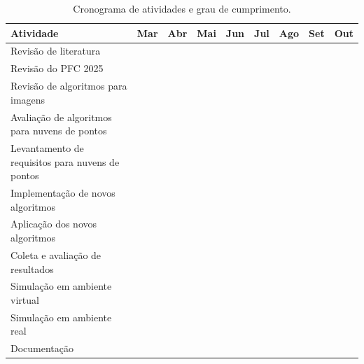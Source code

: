 \documentclass[
    12pt,
    openright,
    oneside,
    a4paper,
    english,
    brazil
]{abntex2}
\begin{document}
\begin{table}[H]
    \centering
    \caption{Cronograma de atividades e grau de cumprimento.}
    \label{tab:cronograma}
    \footnotesize
    \setlength{\tabcolsep}{4pt}
    \renewcommand{\arraystretch}{1.25}
    \begin{tabular}{|l|c|c|c|c|c|c|c|c|}
        \hline
        \textbf{Atividade} & \textbf{Mar} & \textbf{Abr} & \textbf{Mai} & \textbf{Jun} & \textbf{Jul} & \textbf{Ago} & \textbf{Set} & \textbf{Out} \\
        \hline
        Revisão de literatura
            & \cellcolor{cinzaExec} & & & & & & & \\
        \hline
        Revisão do PFC 2025
            & \cellcolor{cinzaExec} & \cellcolor{cinzaExec} & & & & & & \\
        \hline
        Revisão de algoritmos para imagens
            & \cellcolor{cinzaExec} & \cellcolor{cinzaExec} & & & & & & \\
        \hline
        Avaliação de algoritmos para nuvens de pontos
            & \cellcolor{cinzaExec} & \cellcolor{cinzaExec} & & & & & & \\
        \hline
        Levantamento de requisitos para nuvens de pontos
            & \cellcolor{cinzaExec} & \cellcolor{cinzaExec} & & & & & & \\
        \hline
        Implementação de novos algoritmos
            & & \cellcolor{cinzaExec} & \cellcolor{cinzaExec} & & & & & \\
        \hline
        Aplicação dos novos algoritmos
            & & & \cellcolor{cinzaExec} & \cellcolor{cinzaExec} & & & & \\
        \hline
        Coleta e avaliação de resultados
            & & & \cellcolor{cinzaExec} & \cellcolor{cinzaExec} & \cellcolor{cinzaExec} & & & \\
        \hline
        Simulação em ambiente virtual
            & & & & \cellcolor{cinzaExec} & \cellcolor{cinzaExec} & \cellcolor{cinzaExec} & \cellcolor{cinzaExec} & \\
        \hline
        Simulação em ambiente real
            & & & & & & & \cellcolor{cinzaPrev} & \cellcolor{cinzaPrev} \\
        \hline
        Documentação
            & \cellcolor{cinzaExec} & \cellcolor{cinzaExec} & \cellcolor{cinzaExec} & \cellcolor{cinzaExec} & \cellcolor{cinzaExec} & \cellcolor{cinzaExec} & \cellcolor{cinzaExec} & \cellcolor{cinzaExec} \\
        \hline
    \end{tabular}

\end{table}
\end{document}
